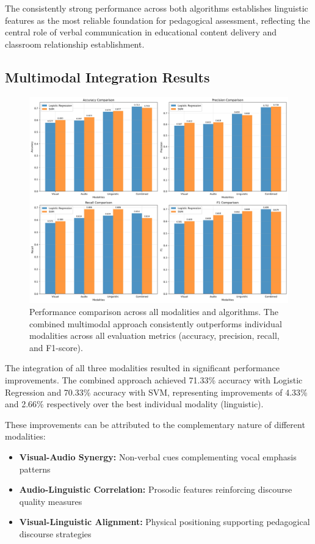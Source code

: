 The consistently strong performance across both algorithms establishes linguistic features as the most reliable foundation for pedagogical assessment, reflecting the central role of verbal communication in educational content delivery and classroom relationship establishment.

\subsection{Multimodal Integration Results}

\begin{figure}[H]
    \centering
    \includegraphics[width=\textwidth]{sections/performance_comparison.jpg}
    \caption{Performance comparison across all modalities and algorithms. The combined multimodal approach consistently outperforms individual modalities across all evaluation metrics (accuracy, precision, recall, and F1-score).}
    \label{fig:performance_comparison}
\end{figure}

The integration of all three modalities resulted in significant performance improvements. The combined approach achieved 71.33\% accuracy with Logistic Regression and 70.33\% accuracy with SVM, representing improvements of 4.33\% and 2.66\% respectively over the best individual modality (linguistic).

These improvements can be attributed to the complementary nature of different modalities:
\begin{itemize}
    \item \textbf{Visual-Audio Synergy:} Non-verbal cues complementing vocal emphasis patterns
    \item \textbf{Audio-Linguistic Correlation:} Prosodic features reinforcing discourse quality measures
    \item \textbf{Visual-Linguistic Alignment:} Physical positioning supporting pedagogical discourse strategies
\end{itemize}

